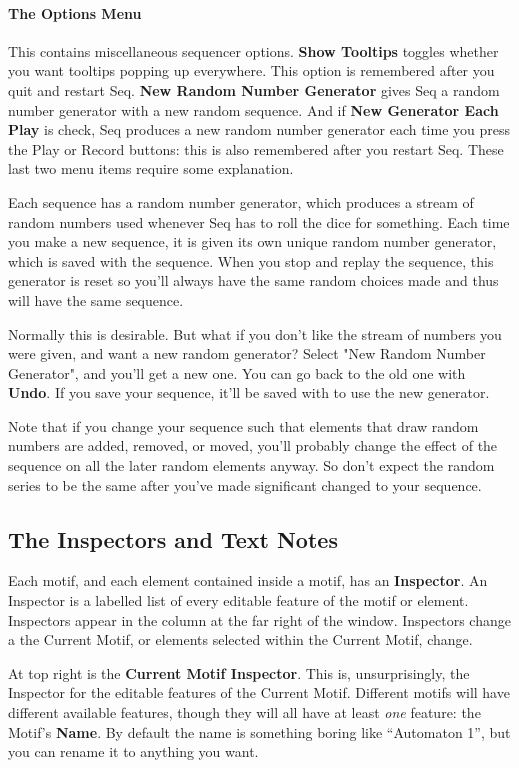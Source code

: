 \documentclass[twoside,10pt]{article}
\begin{document}
\paragraph{The Options Menu}  This contains miscellaneous sequencer options.  {\bf Show Tooltips} toggles whether you want tooltips popping up everywhere.  This option is remembered after you quit and restart Seq.  {\bf  New Random Number Generator} gives Seq a random number generator with a new random sequence.  And if {\bf New Generator Each Play} is check, Seq produces a new random number generator each time you press the Play or Record buttons: this is also remembered after you restart Seq.  These last two menu items require some explanation.

Each sequence has a random number generator, which produces a stream of random numbers used whenever Seq has to roll the dice for something.  Each time you make a new sequence, it is given its own  unique random number generator, which is saved with the sequence.  When you stop and replay the sequence, this generator is reset so you'll always have the same random choices made and thus will have the same sequence.

Normally this is desirable.  But what if you don't like the stream of numbers you were given, and want a new random generator?  Select "New Random Number Generator", and you'll get a new one.  You can go back to the old one with {\bf Undo}.  If you save your sequence, it'll be saved with to use the new generator.

Note that if you change your sequence such that elements that draw random numbers are added, removed, or moved, you'll probably change the effect of the sequence on all the later random elements anyway.  So don't expect the random series to be the same after you've made significant changed to your sequence.

\subsection{The Inspectors and Text Notes}

Each motif, and each element contained inside a motif, has an {\bf Inspector}.  An Inspector is a labelled list of every editable feature of the motif or element.  Inspectors appear in the column at the far right of the window.  Inspectors change a the Current Motif, or elements selected within the Current Motif, change.

At top right is the {\bf Current Motif Inspector}.  This is, unsurprisingly, the Inspector for the editable features of the Current Motif.  Different motifs will have different available features, though they will all have at least {\it one} feature: the Motif's {\bf Name}.  By default the name is something boring like ``Automaton 1'', but you can rename it to anything you want.
\end{document}
